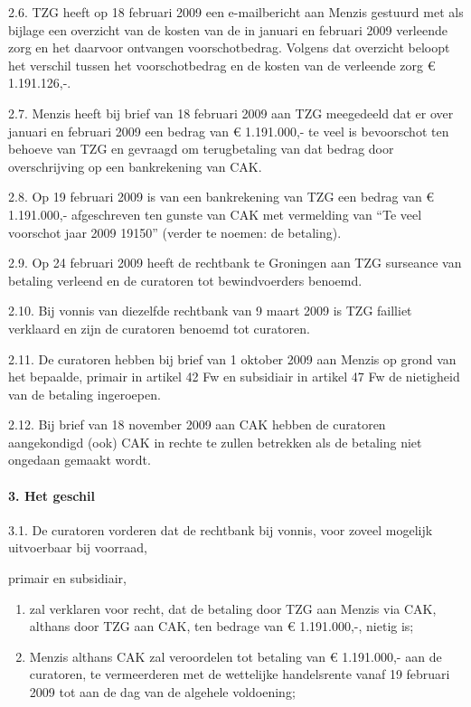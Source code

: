 \documentclass[
  dutch,
  a4paper,
]{article}
\begin{document}
2.6. TZG heeft op 18 februari 2009 een e-mailbericht aan Menzis gestuurd met als bijlage een overzicht van de kosten van de in januari en februari 2009 verleende zorg en het daarvoor ontvangen voorschotbedrag. Volgens dat overzicht beloopt het verschil tussen het voorschotbedrag en de kosten van de verleende zorg € 1.191.126,-.

2.7. Menzis heeft bij brief van 18 februari 2009 aan TZG meegedeeld dat er over januari en februari 2009 een bedrag van € 1.191.000,- te veel is bevoorschot ten behoeve van TZG en gevraagd om terugbetaling van dat bedrag door overschrijving op een bankrekening van CAK.

2.8. Op 19 februari 2009 is van een bankrekening van TZG een bedrag van € 1.191.000,- afgeschreven ten gunste van CAK met vermelding van ``Te veel voorschot jaar 2009 19150'' (verder te noemen: de betaling).

2.9. Op 24 februari 2009 heeft de rechtbank te Groningen aan TZG surseance van betaling verleend en de curatoren tot bewindvoerders benoemd.

2.10. Bij vonnis van diezelfde rechtbank van 9 maart 2009 is TZG failliet verklaard en zijn de curatoren benoemd tot curatoren.

2.11. De curatoren hebben bij brief van 1 oktober 2009 aan Menzis op grond van het bepaalde, primair in artikel 42 Fw en subsidiair in artikel 47 Fw de nietigheid van de betaling ingeroepen.

2.12. Bij brief van 18 november 2009 aan CAK hebben de curatoren aangekondigd (ook) CAK in rechte te zullen betrekken als de betaling niet ongedaan gemaakt wordt.

\paragraph{3. Het geschil}\label{het-geschil-3}

3.1. De curatoren vorderen dat de rechtbank bij vonnis, voor zoveel mogelijk uitvoerbaar bij voorraad,

primair en subsidiair,

\begin{enumerate}
\def\labelenumi{(\roman{enumi})}
\item
  zal verklaren voor recht, dat de betaling door TZG aan Menzis via CAK, althans door TZG aan CAK, ten bedrage van € 1.191.000,-, nietig is;
\item
  Menzis althans CAK zal veroordelen tot betaling van € 1.191.000,- aan de curatoren, te vermeerderen met de wettelijke handelsrente vanaf 19 februari 2009 tot aan de dag van de algehele voldoening;
\end{enumerate}
\end{document}
